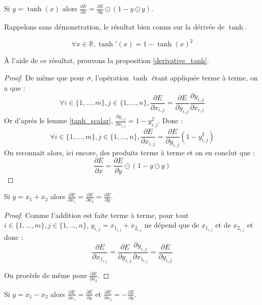 \begin{proposition}
Si $y = \tanh(x)$ alors $\frac{\partial E}{\partial x} = \frac{\partial E}{\partial y} \odot (1 - y \odot y)$.
\label{derivative_tanh}
\end{proposition}

Rappelons sans démonstration, le résultat bien connu sur la dérivée de $\tanh$.

\begin{lemma}
$$ 
\forall x \in \mathbb{R}, \tanh'(x) = 1 - \tanh(x)^2
$$
\label{tanh_scalar}
\end{lemma}

À l'aide de ce résultat, prouvons la proposition \ref{derivative_tanh}.

\begin{proof}
De même que pour $\sigma$, l'opération $\tanh$ étant appliquée terme à terme, on a que :
$$
\forall i \in \{1, ..., m\}, j \in \{1, ..., n\}, \frac{\partial E}{\partial x_{i, j}} = \frac{\partial E}{\partial y_{i, j}}\frac{\partial y_{i, j}}{\partial x_{i, j}}
$$
Or d'après le lemme \ref{tanh_scalar}, $\frac{\partial y_{i, j}}{\partial x_{i, j}} = 1 - y_{i, j}^2$. Donc :
$$
\forall i \in \{1, ..., m\}, j \in \{1, ..., n\}, \frac{\partial E}{\partial x_{i, j}} = \frac{\partial E}{\partial y_{i, j}}(1 - y_{i, j}^2)
$$
On reconnait alors, ici encore, des produits terme à terme et on en conclut que :
$$
\frac{\partial E}{\partial x} = \frac{\partial E}{\partial y} \odot (1 - y \odot y)
$$
\end{proof}

\begin{proposition}
Si $y = x_1 + x_2$ alors $\frac{\partial E}{\partial x_1} = \frac{\partial E}{\partial x_2} = \frac{\partial E}{\partial y}$.
\end{proposition}

\begin{proof}
Comme l'addition est faite terme à terme, pour tout $i \in \{1, ..., m\}, j \in \{1, ..., n\}$, $y_{i, j} = x_{1_{i, j}} + x_{2_{i, j}}$ ne dépend que de $x_{1_{i, j}}$ et de $x_{2_{i, j}}$ et donc :
$$
\frac{\partial E}{\partial x_{1_{i, j}}} = \frac{\partial E}{\partial y_{i, j}}\frac{\partial y_{i, j}}{\partial x_{1_{i, j}}} = \frac{\partial E}{\partial y_{i, j}}
$$ 

On procède de même pour $\frac{\partial E}{\partial x_2}$.
\end{proof}

\begin{proposition}
Si $y = x_1 - x_2$ alors $\frac{\partial E}{\partial x_1} = \frac{\partial E}{\partial y}$ et $\frac{\partial E}{\partial x_2} = -\frac{\partial E}{\partial y}$.
\end{proposition}

